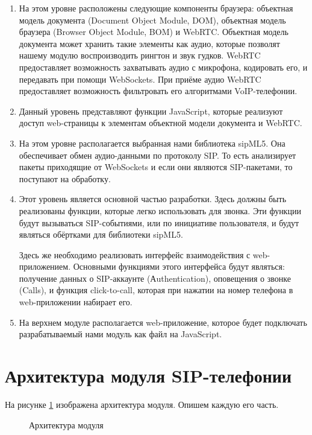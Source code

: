 \begin{enumerate}
\item На этом уровне расположены следующие компоненты браузера: объектная модель документа (Document Object Module, DOM), объектная модель браузера (Browser Object Module, BOM) и WebRTC. Объектная модель документа может хранить такие элементы как аудио, которые позволят нашему модулю воспроизводить рингтон и звук гудков. WebRTC предоставляет возможность захватывать аудио с микрофона, кодировать его, и передавать при помощи WebSockets. При приёме аудио WebRTC предоставляет возможность фильтровать его алгоритмами VoIP-телефонии.

\item Данный уровень представляют функции JavaScript, которые реализуют доступ web-страницы к элементам объектной модели документа и WebRTC.

\item На этом уровне располагается выбранная нами библиотека sipML5. Она обеспечивает обмен аудио-данными по протоколу SIP. То есть анализирует пакеты приходящие от WebSockets и если они являются SIP-пакетами, то поступают на обработку.

\item Этот уровень является основной частью разработки. Здесь должны быть реализованы функции, которые легко использовать для звонка. Эти функции будут вызываться SIP-событиями, или по инициативе пользователя, и будут являться обёртками для библиотеки sipML5.

Здесь же необходимо реализовать интерфейс взаимодействия с web-приложением. Основными функциями этого интерфейса будут являться: получение данных о SIP-аккаунте (Аuthentication), оповещения о звонке (Calls), и функция click-to-call, которая при нажатии на номер телефона в web-приложении набирает его.

\item На верхнем модуле располагается web-приложение, которое будет подключать разрабатываемый нами модуль как файл на JavaScript.
\end{enumerate}

\section{Архитектура модуля SIP-телефонии}

На рисунке \ref{image:architecture} изображена архитектура модуля. Опишем каждую его часть.

\begin{figure}[h!]
\caption{Архитектура модуля}
\label{image:architecture}
\end{figure}

